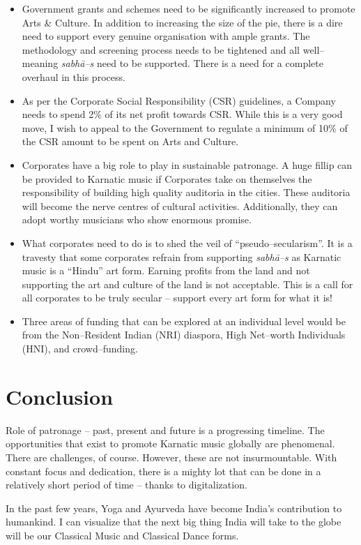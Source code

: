 \begin{itemize}
 \item Government grants and schemes need to be significantly increased to promote Arts \& Culture. In addition to increasing the size of the pie, there is a dire need to support every genuine organisation with ample grants. The methodology and screening process needs to be tightened and all well–meaning \textit{sabhā–s} need to be supported. There is a need for a complete overhaul in this process.

 \item As per the Corporate Social Responsibility (CSR) guidelines, a Company needs to spend 2\% of its net profit towards CSR. While this is a very good move, I wish to appeal to the Government to regulate a minimum of 10\% of the CSR amount to be spent on Arts and Culture.

 \item Corporates have a big role to play in sustainable patronage. A huge fillip can be provided to Karnatic music if Corporates take on themselves the responsibility of building high quality auditoria in the cities. These auditoria will become the nerve centres of cultural activities. Additionally, they can adopt worthy musicians who show enormous promise.

 \item What corporates need to do is to shed the veil of “pseudo–secularism”. It is a travesty that some corporates refrain from supporting \textit{sabhā–s} as Karnatic music is a “Hindu” art form. Earning profits from the land and not supporting the art and culture of the land is not acceptable. This is a call for all corporates to be truly secular – support every art form for what it is!

 \item Three areas of funding that can be explored at an individual level would be from the Non–Resident Indian (NRI) diaspora, High Net–worth Individuals (HNI), and crowd–funding.

\end{itemize}


\section*{Conclusion}

Role of patronage – past, present and future is a progressing timeline. The opportunities that exist to promote Karnatic music globally are phenomenal. There are challenges, of course. However, these are not insurmountable. With constant focus and dedication, there is a mighty lot that can be done in a relatively short period of time – thanks to digitalization.

In the past few years, Yoga and Ayurveda have become India’s contribution to humankind. I can visualize that the next big thing India will take to the globe will be our Classical Music and Classical Dance forms.

